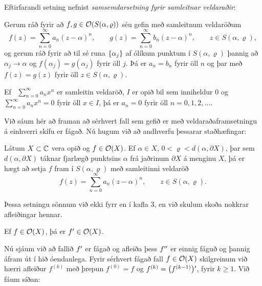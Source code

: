 Eftirfarandi setning nefnist {\it
samsemdarsetning fyrir samleitnar
veldaraðir}: 

\begin{se}
Gerum ráð fyrir að $f,g\in {\cal O}(S(\alpha,\varrho))$ séu gefin með
samleitnum veldaröðum
 $$f(z)=\sum\limits_{n=0}^\infty a_n(z-\alpha)^n, \qquad
g(z)=\sum\limits_{n=0}^\infty b_n(z-\alpha)^n, \qquad
z\in S(\alpha,\varrho),
 $$
og gerum ráð fyrir að til sé runa ${\{\alpha_j\}}$ af ólíkum punktum
í $S(\alpha,\varrho)$ þannig að $\alpha_j\to \alpha$ og
$f(\alpha_j)=g(\alpha_j)$ fyrir öll $j$.  Þá er $a_n=b_n$ fyrir öll
$n$ og þar með $f(z)=g(z)$ fyrir öll $z\in S(\alpha,\varrho)$.
\end{se} 
 
\begin{fs}  Ef \ $\sum_{n=0}^{\infty} a_nx^n$ er samleitin veldaröð,
$I$ er opið bil sem inniheldur $0$ og   $\sum_{n=0}^{\infty}
a_nx^n=0$  fyrir öll $x\in I$, þá er $a_n=0$ fyrir öll $n=0,1,2,\dots$.
\end{fs}


Við sáum hér að framan að 
sérhvert fall sem gefið er með veldaraðaframsetningu á
einhverri skífu er fágað.  Nú hugum við að andhverfu þessarar
staðhæfingar:

\begin{se}
Látum $X\subset {\mathbb C}$ vera opið og $f\in {\cal O}(X)$.  Ef $\alpha\in X$,
$0<\varrho<d(\alpha,\partial X)$, þar sem  $d(\alpha,\partial X)$
táknar fjarlægð punktsins $\alpha$ frá jaðrinum $\partial X$ á
menginu $X$, þá er hægt að setja $f$ fram í $S(\alpha,\varrho)$ með
samleitinni veldaröð  
 $$f(z) = \sum\limits_{n=0}^\infty a_n(z-\alpha)^n, \qquad z\in
S(\alpha,\varrho). 
 $$
 \end{se}



Þessa setningu sönnum við ekki fyrr en í kafla 3, en við skulum skoða
nokkrar afleiðingar hennar.  

\begin{fs}
Ef $f\in {\cal O}(X)$, þá er $f{\sp{\prime}}\in {\cal O}(X)$.
\end{fs}

\bigskip
Nú sjáum við að fallið $f{\sp{\prime}}$ er fágað og afleiða þess $f{\sp{\prime\prime}}$ er
einnig fáguð og þannig áfram út í hið óendanlega.  Fyrir sérhvert
fágað fall $f\in {\cal O}(X)$ skilgreinum við hærri afleiður $f^{(k)}$ með
þrepun $f^{(0)}=f$ og $f^{(k)}=\big(f^{(k-1)}\big){\sp{\prime}}$, fyrir
$k\geq 1$. Við fáum síðan:

